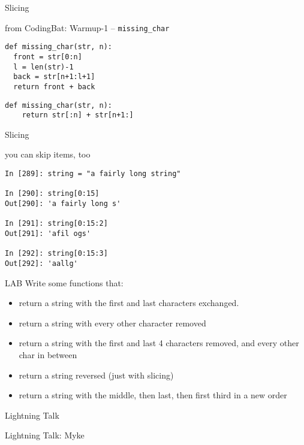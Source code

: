 \documentclass{beamer}
\begin{document}
\begin{frame}[fragile]{Slicing}

{\Large from CodingBat: Warmup-1 -- \verb+missing_char+ }

\begin{verbatim}
def missing_char(str, n):
  front = str[0:n]
  l = len(str)-1
  back = str[n+1:l+1]
  return front + back
\end{verbatim}

\begin{verbatim}
def missing_char(str, n):
    return str[:n] + str[n+1:]
\end{verbatim}

\end{frame} 

\begin{frame}[fragile]{Slicing}

{\Large you can skip items, too}

\begin{verbatim}
In [289]: string = "a fairly long string"

In [290]: string[0:15]
Out[290]: 'a fairly long s'

In [291]: string[0:15:2]
Out[291]: 'afil ogs'

In [292]: string[0:15:3]
Out[292]: 'aallg'
\end{verbatim}

\end{frame} 


\begin{frame}{LAB}
Write some functions that:
\begin{itemize}
\item return a string with the first and last characters exchanged.
\item return a string with every other character removed
\item return a string with the first and last 4 characters removed, and every other char in between
\item return a string reversed (just with slicing)
\item return a string with the middle, then last, then first third in a new order
\end{itemize}
\end{frame}

\begin{frame}{Lightning Talk}

{\LARGE Lightning Talk: Myke }

\end{frame}
\end{document}
